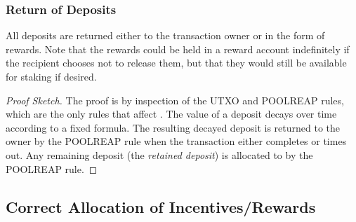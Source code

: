 

\subsubsection{Return of Deposits}

All deposits are returned either to the transaction owner or in the form of rewards. Note that the rewards could be held in a reward account indefinitely if the recipient
chooses not to release them, but that they would still be available for staking if desired.


\begin{proof}[Proof Sketch]

\noindent
The proof is by inspection of the UTXO and POOLREAP rules, which are the only rules that affect .
The value of a deposit decays over time according to a fixed formula. The resulting decayed deposit is returned
to the owner by the POOLREAP rule when the transaction either completes or times out.
Any remaining deposit (the \emph{retained deposit}) is allocated to  by the POOLREAP rule.
\end{proof}

\subsection{Correct Allocation of Incentives/Rewards}

